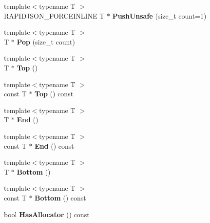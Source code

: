 \begin{DoxyCompactItemize}
\item 
{\footnotesize template$<$typename T $>$ }\\R\+A\+P\+I\+D\+J\+S\+O\+N\+\_\+\+F\+O\+R\+C\+E\+I\+N\+L\+I\+NE T $\ast$ {\bfseries Push\+Unsafe} (size\+\_\+t count=1)\hypertarget{a00283_a63b4eabd209d4fc9b43027f4e5660532}{}\label{a00283_a63b4eabd209d4fc9b43027f4e5660532}

\item 
{\footnotesize template$<$typename T $>$ }\\T $\ast$ {\bfseries Pop} (size\+\_\+t count)\hypertarget{a00283_a8545a8ccba595ac6e4ade9784474aa1c}{}\label{a00283_a8545a8ccba595ac6e4ade9784474aa1c}

\item 
{\footnotesize template$<$typename T $>$ }\\T $\ast$ {\bfseries Top} ()\hypertarget{a00283_ab3ed5b4afed3c73c516678516d5e195b}{}\label{a00283_ab3ed5b4afed3c73c516678516d5e195b}

\item 
{\footnotesize template$<$typename T $>$ }\\const T $\ast$ {\bfseries Top} () const \hypertarget{a00283_aa76b4cd53b9c3c65e544d14565eda7ae}{}\label{a00283_aa76b4cd53b9c3c65e544d14565eda7ae}

\item 
{\footnotesize template$<$typename T $>$ }\\T $\ast$ {\bfseries End} ()\hypertarget{a00283_a54987ae8ad774dd3ee80a43d268ef080}{}\label{a00283_a54987ae8ad774dd3ee80a43d268ef080}

\item 
{\footnotesize template$<$typename T $>$ }\\const T $\ast$ {\bfseries End} () const \hypertarget{a00283_a439ba97dc85710d469c65c1815dd4484}{}\label{a00283_a439ba97dc85710d469c65c1815dd4484}

\item 
{\footnotesize template$<$typename T $>$ }\\T $\ast$ {\bfseries Bottom} ()\hypertarget{a00283_a10aa1bc716b82cb0a40b3a3b9d5efe87}{}\label{a00283_a10aa1bc716b82cb0a40b3a3b9d5efe87}

\item 
{\footnotesize template$<$typename T $>$ }\\const T $\ast$ {\bfseries Bottom} () const \hypertarget{a00283_ae5057459b0f4cbb0cb6b541f99f60e07}{}\label{a00283_ae5057459b0f4cbb0cb6b541f99f60e07}

\item 
bool {\bfseries Has\+Allocator} () const \hypertarget{a00283_a6cd7033d53a1da185ea6dc2e15f7234c}{}\label{a00283_a6cd7033d53a1da185ea6dc2e15f7234c}


\end{DoxyCompactItemize}
